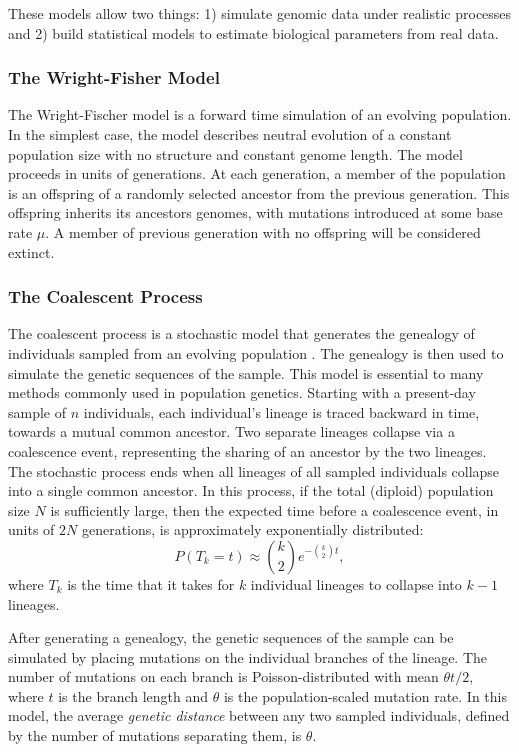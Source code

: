These models allow two things: 1) simulate genomic data under realistic processes and 2) build statistical models to estimate biological parameters from real data.

\subsubsection{The Wright-Fisher Model}
\label{bg:bio:models:wrightfisher}

The Wright-Fischer model is a forward time simulation of an evolving population.
In the simplest case, the model describes neutral evolution of a constant population size with no structure and constant genome length.
The model proceeds in units of generations.
At each generation, a member of the population is an offspring of a randomly selected ancestor from the previous generation.
This offspring inherits its ancestors genomes, with mutations introduced at some base rate $\mu$.
A member of previous generation with no offspring will be considered extinct.

\subsubsection{The Coalescent Process}
\label{bg:bio:models:coalescent}

The coalescent process is a stochastic model that generates the genealogy of individuals sampled from an evolving population \cite{Wakeley:2009}.
The genealogy is then used to simulate the genetic sequences of the sample.
This model is essential to many methods commonly used in population genetics.
Starting with a present-day sample of $n$ individuals, each individual's lineage is traced backward in time, towards a mutual common ancestor.
Two separate lineages collapse via a coalescence event, representing the sharing of an ancestor by the two lineages.
The stochastic process ends when all lineages of all sampled individuals collapse into a single common ancestor.
In this process, if the total (diploid) population size $N$ is sufficiently large, then the expected time before a coalescence event, in units of $2N$ generations, is approximately exponentially distributed:
\begin{equation}
P(T_{k}=t) \approx \binom{k}{2} e^{-\binom{k}{2} t},
\end{equation}
where $T_k$ is the time that it takes for $k$ individual lineages to collapse into $k-1$ lineages.

After generating a genealogy, the genetic sequences of the sample can be simulated by placing mutations on the individual branches of the lineage.
The number of mutations on each branch is Poisson-distributed with mean $\theta t / 2$, where $t$ is the branch length and $\theta$ is the population-scaled mutation rate.
In this model, the average \emph{genetic distance} between any two sampled individuals, defined by the number of mutations separating them, is $\theta$.

